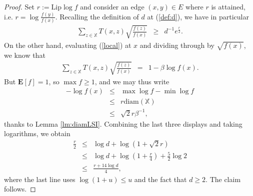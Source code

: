 \documentclass[12pt,final]{article}
\numberwithin{equation}{section}
\newcommand{\Lip}{\mathrm {Lip}}
\newcommand{\bE}{{\mathbf{E}}}
\newcommand{\dX}{\mathbb{X}}
\newcommand{\diam}{\mathrm{diam}}
\begin{document}
\begin{proof}
Set $r:=\Lip \log f$ and consider an edge $(x,y)\in E$ where $r$ is attained, i.e.
$
r  = \log\frac{f(y)}{f(x)}.
$
Recalling the definition of $d$ at (\ref{def:d}), we have in particular
\begin{eqnarray*}
\sum_{z\in\dX}T(x,z)\sqrt{\frac{f(z)}{f(x)}} & \ge & d^{-1}e^{\frac{r}2}.
\end{eqnarray*}
On the other hand, evaluating (\ref{local}) at  $x$ and dividing through by $\sqrt{f(x)}$, we know that
\begin{eqnarray*}
\sum_{z\in\dX}T(x,z)\sqrt{\frac{f(z)}{f(x)}} & = & 1-\beta\log f(x).
\end{eqnarray*}
But $\bE[f]=1$, so $\max f\geq 1$, and we may thus write
\begin{eqnarray*}
-\log f(x) & \le & \max \log f-\min \log f \\
& \le & r\diam(\dX) \\
& \le & \sqrt{2}r\beta^{-1},
\end{eqnarray*}
thanks to Lemma \ref{lm:diamLSI}. Combining the last three displays and taking logarithms, we obtain
\begin{eqnarray*}
\frac{r}{2} & \le & \log d+\log \left(1+\sqrt{2}r\right)\\
& \le & \log d +\log\left(1+\frac{r}4\right)+\frac{5}{2}\log 2\\
& \le & \frac{r+14\log d}4,
\end{eqnarray*}
where the last line uses $\log (1+u)\le u$ and the fact that $d\ge 2$. The claim follows.
\end{proof}
\end{document}

